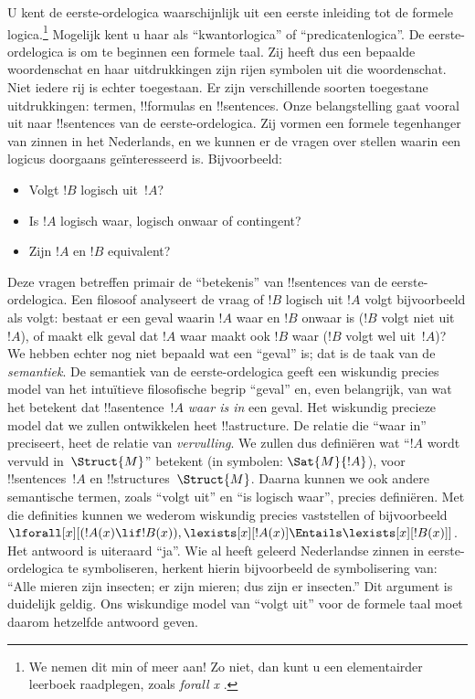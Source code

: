 \documentclass[../../../include/open-logic-section]{subfiles}
\begin{document}


U kent de eerste-ordelogica waarschijnlijk uit een eerste inleiding tot
de formele logica.\footnote{We nemen dit min of meer aan!{} Zo niet, dan
kunt u een elementairder leerboek raadplegen, zoals \emph{forall x}
\citep{Magnus2021}.} Mogelijk kent u haar als ``kwantorlogica'' of
``predicatenlogica''. De eerste-ordelogica is om te beginnen een formele
taal. Zij heeft dus een bepaalde woordenschat en haar uitdrukkingen zijn
rijen symbolen uit die woordenschat. Niet iedere rij is echter
toegestaan. Er zijn verschillende soorten toegestane uitdrukkingen:
termen, !!{formula}s en !!{sentence}s. Onze belangstelling gaat vooral
uit naar !!{sentence}s van de eerste-ordelogica. Zij vormen een formele
tegenhanger van zinnen in het Nederlands, en we kunnen er de vragen over
stellen waarin een logicus doorgaans geïnteresseerd is. Bijvoorbeeld:
\begin{itemize}
    \item Volgt $!B$ logisch uit~$!A$?
    \item Is $!A$ logisch waar, logisch onwaar of
contingent?
    \item Zijn $!A$ en $!B$ equivalent?
\end{itemize}

Deze vragen betreffen primair de ``betekenis'' van !!{sentence}s van de
eerste-ordelogica. Een filosoof analyseert de vraag of $!B$ logisch uit
$!A$ volgt bijvoorbeeld als volgt: bestaat er een geval waarin $!A$
waar en $!B$ onwaar is ($!B$ volgt niet uit~$!A$), of maakt elk geval
dat $!A$ waar maakt ook $!B$ waar ($!B$ volgt wel uit~$!A$)? We hebben
echter nog niet bepaald wat een ``geval'' is; dat is de taak van de
\emph{semantiek}. De semantiek van de eerste-ordelogica geeft een
wiskundig precies model van het intuïtieve filosofische begrip ``geval''
en, even belangrijk, van wat het betekent dat !!a{sentence}~$!A$
\emph{waar is in} een geval. Het wiskundig precieze model dat we zullen
ontwikkelen heet !!a{structure}. De relatie die ``waar in'' preciseert,
heet de relatie van \emph{vervulling}. We zullen dus definiëren wat
``$!A$ wordt vervuld in~$\Struct{M}$'' betekent (in symbolen:
$\Sat{M}{!A}$), voor !!{sentence}s~$!A$ en !!{structure}s~$\Struct{M}$.
Daarna kunnen we ook andere semantische termen, zoals ``volgt uit'' en
``is logisch waar'', precies definiëren. Met die definities kunnen we
wederom wiskundig precies
vaststellen of bijvoorbeeld $\lforall[x][(!A(x) \lif !B(x)),
\lexists[x][!A(x)] \Entails \lexists[x][!B(x)]]$. Het antwoord is
uiteraard ``ja''. Wie al heeft geleerd Nederlandse zinnen in
eerste-ordelogica te symboliseren, herkent hierin bijvoorbeeld de
symbolisering van: ``Alle mieren zijn insecten; er zijn mieren; dus zijn
er insecten.'' Dit argument is duidelijk geldig. Ons wiskundige model
van ``volgt uit'' voor de formele taal moet daarom hetzelfde antwoord
geven.
\end{document}
